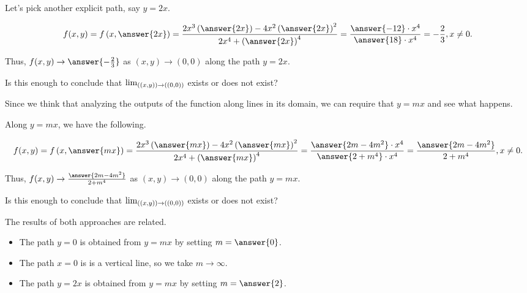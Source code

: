 \documentclass{ximera}
\begin{document}
\begin{exercise}
\begin{exercise}
\begin{exercise}
Let's pick another explicit path, say $y=2x$.  

\[
f(x,y) = f\left(x,\answer{2x}\right) =\frac{2x^3\left(\answer{2x}\right)-4x^2\left(\answer{2x}\right)^2}{2x^4+\left(\answer{2x}\right)^4} = \frac{\answer{-12}\cdot x^4}{\answer{18}\cdot x^4} = -\frac{2}{3}, x \neq 0.
\]

Thus, $f(x,y) \to \answer{-\frac{2}{3}}$ as $(x,y) \to (0,0)$ along the path $y=2x$.

Is this enough to conclude that $\lim_{\left((x,y)\right) \to \left((0,0)\right)}$ exists or does not exist?

\begin{multipleChoice}
\end{multipleChoice}

\end{exercise}
\end{exercise}
\begin{exercise}
Since we think that analyzing the outputs of the function along lines in its domain, we can require that $y=mx$ and see what happens.

Along $y=mx$, we have the following.  

\[
f(x,y) = f\left(x,\answer{mx}\right) =\frac{2x^3\left(\answer{mx}\right)-4x^2\left(\answer{mx}\right)^2}{2x^4+\left(\answer{mx}\right)^4} = \frac{\answer{2m-4m^2}\cdot x^4}{\answer{2+m^4}\cdot x^4} = \frac{\answer{2m-4m^2}}{2+m^4}, x \neq 0.
\]

Thus, $f(x,y) \to \frac{\answer{2m-4m^2}}{2+m^4}$ as $(x,y) \to (0,0)$ along the path $y=mx$.

Is this enough to conclude that $\lim_{\left((x,y)\right) \to \left((0,0)\right)}$ exists or does not exist?

\begin{multipleChoice}
\end{multipleChoice}

\begin{exercise}
The results of both approaches are related.

\begin{itemize}
\item The path $y=0$ is obtained from $y=mx$ by setting $m = \answer{0}$.  
\item The path $x=0$ is is a vertical line, so we take $m \to \infty$.
\item The path $y=2x$ is obtained from $y=mx$ by setting $m = \answer{2}$.


\end{itemize}
\end{exercise}
\end{exercise}
\end{exercise}
\end{document}
